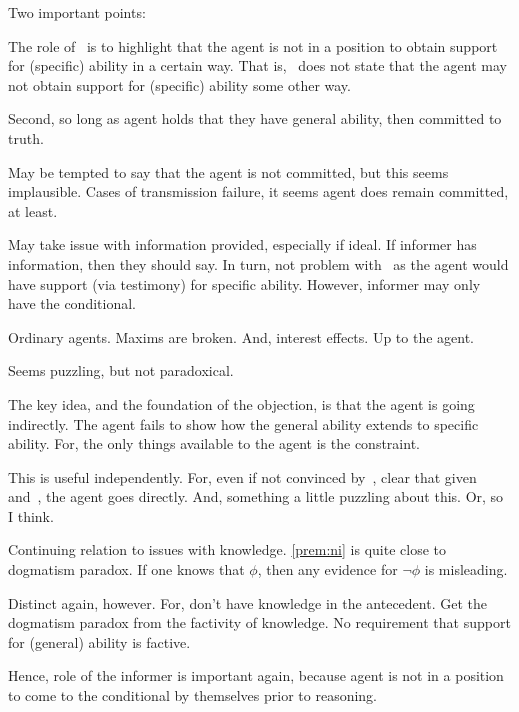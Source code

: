\begin{note}
  Two important points:

  The role of~\nI{} is to highlight that the agent is not in a position to obtain support for (specific) ability in a certain way.
  That is,~\nI{} does not state that the agent may not obtain support for (specific) ability some other way.

  Second, so long as agent holds that they have general ability, then committed to truth.

  May be tempted to say that the agent is not committed, but this seems implausible.
  Cases of transmission failure, it seems agent does remain committed, at least.

  May take issue with information provided, especially if ideal.
  If informer has information, then they should say.
  In turn, not problem with~\nI{} as the agent would have support (via testimony) for specific ability.
  However, informer may only have the conditional.

  Ordinary agents.
  Maxims are broken.
  And, interest effects.
  Up to the agent.

  Seems puzzling, but not paradoxical.
\end{note}

\begin{note}
  The key idea, and the foundation of the objection, is that the agent is going indirectly.
  The agent fails to show how the general ability extends to specific ability.
  For, the only things available to the agent is the constraint.

  This is useful independently.
  For, even if not convinced by~\nI{}, clear that given \gsi{} and~\uRa{}, the agent goes directly.
  And, something a little puzzling about this.
  Or, so I think.
\end{note}

\begin{note}[Dogmatism]
  Continuing relation to issues with knowledge.
  \autoref{prem:ni} is quite close to dogmatism paradox.
  If one knows that \(\phi\), then any evidence for \(\lnot \phi\) is misleading.

  Distinct again, however.
  For, don't have knowledge in the antecedent.
  Get the dogmatism paradox from the factivity of knowledge.
  No requirement that support for (general) ability is factive.

  Hence, role of the informer is important again, because agent is not in a position to come to the conditional by themselves prior to reasoning.
\end{note}

